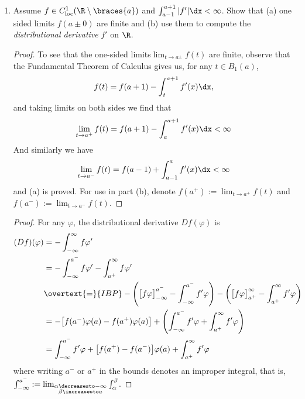 \documentclass[12pt,letterpaper]{article}
\renewcommand{\phi}{\varphi}
\begin{document}
\begin{enumerate}
\begin{enumerate}[label=(\alph*)]
	\item A fundamental and hard theorem of real variable theory states that
the converse is true. However, for one particular $p$ it is easy to prove that $\norm{\frac{\del_1}{|\nabla|}\phi}_p\leq C\norm{\phi}_p$ \quad $\forall \phi\in\script{S}$. Find that $p$ and prove the estimate. What is your $C$?
	\begin{proof}
	Since Hausdorff-Young gives us that $\norm{\hat{\phi}}_2\leq\norm{\phi}_2$ for all $\phi\in\S,$ then 
	\begin{align*}
	\norm{\left(\frac{k_1}{|k|}\hat{\phi}\right)^\vee}_2 
	& \leq \norm{\left(\frac{k_1}{|k|}\hat{\phi}\right)}_2 \\
	& \leq \norm{\hat{\phi}}_2 \quad \text{because } \frac{k_1}{|k|}\leq1\\
	&<\norm{\phi}_2
	\end{align*}
	So $C=1$. 
	\end{proof}
	\end{enumerate}

\pagebreak	
\item Assume $f\in C^1_\text{loc}(\R\setminus\braces{a})$	 and $\int_{a-1}^{a+1}|f'|\dx<\infty$. Show that (a) one sided limits $f(a\pm0)$ are finite and (b) use them to compute the \textit{distributional derivative} $f'$ on $\R$.
\begin{proof}
To see that the one-sided limits$\lim_{t\to a^\pm}f(t)$ are finite, observe that the Fundamental Theorem of Calculus gives us, for any $t\in B_1(a)$, 
$$f(t)= f(a+1)- \int_t^{a+1} f'(x) \dx,$$
and taking limits on both sides we find that 
$$\lim_{t\to a^+}f(t) = f(a+1)- \int_a^{a+1} f'(x) \dx < \infty$$
And similarly we have 
$$\lim_{t\to a^-}f(t) = f(a-1) + \int_{a-1}^{a} f'(x) \dx < \infty$$
and (a) is proved. For use in part (b), denote $f(a^+):= \lim_{t\to a^+}f(t)$ and $f(a^-):= \lim_{t\to a^-}f(t)$. \qedwhitehere
\end{proof}
\begin{proof}
For any $\phi$, the distributional derivative $Df(\phi)$ is 
\begin{align*}
(Df)(\phi) &=- \int_{-\infty}^\infty f\phi' \\
&= -\int_{-\infty}^{a^-} f\phi'  -\int_{a^+}^\infty f\phi'\\
&\overtext{=}{IBP}-\left(\big[f\phi\big]_{-\infty}^{a^-} - \int_{-\infty}^{a^-} f'\phi\right) - \left(\big[f\phi\big]_{a^+}^\infty - \int_{a^+}^\infty f'\phi\right) \\
&= -\big[f(a^-)\phi(a)-f(a^+)\phi(a)\big]+ \left(\int_{-\infty}^{a^-} f'\phi + \int_{a^+}^\infty f'\phi\right) \\
&= \int_{-\infty}^{a^-} f'\phi + \big[f(a^+)-f(a^-)\big]\phi(a) + \int_{a^+}^\infty f'\phi
\end{align*}
where writing $a^-$ or $a^+$ in the bounds denotes an improper integral, that is, $\int_{-\infty}^{a^-}:=\lim_{\substack{\alpha\decreasesto-\infty \\ \beta\increasesto a}}\int_\alpha^\beta$.
\end{proof}
	
\end{enumerate}
\end{document}
